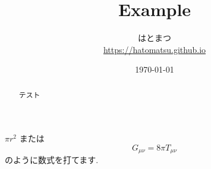 \documentclass[a4paper, 10pt]{ltjsarticle}
\title{Example}
\author{はとまつ \\ \url{https://hatomatsu.github.io}}
\date{\today}
\begin{document}
\maketitle
\begin{abstract}
テスト
\end{abstract}

$\pi r^2$ または
\[G_{\mu\nu}=8\pi T_{\mu\nu}\]
のように数式を打てます. 
\end{document}
